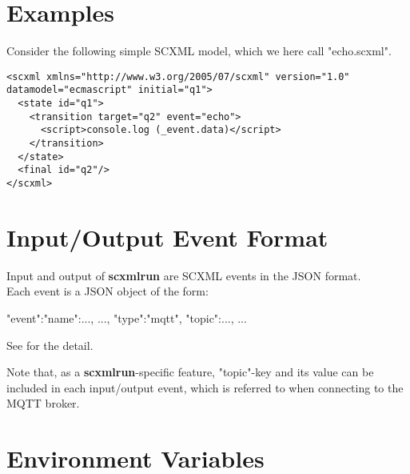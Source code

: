 \documentclass[fancy]{article}
\begin{document}
\section{Examples}
Consider the following simple SCXML model, which we here call "echo.scxml".

\begin{verbatim}
<scxml xmlns="http://www.w3.org/2005/07/scxml" version="1.0" datamodel="ecmascript" initial="q1">
  <state id="q1">
    <transition target="q2" event="echo">
      <script>console.log (_event.data)</script>
    </transition>
  </state>
  <final id="q2"/>
</scxml>
\end{verbatim}


\section{Input/Output Event Format}

Input and output of \textbf{scxmlrun} are SCXML events in the JSON format.\\
Each event is a JSON object of the form:
\begin{center}
\LBr"event":\LBr"name":..., ...\RBr, "type":"mqtt", "topic":..., ...\RBr
\end{center}

See  for the detail.

Note that, as a \textbf{scxmlrun}-specific feature,
"topic"-key and its value can be included in each input/output event,
which is referred to when connecting to the MQTT broker.

\section{Environment Variables}
\end{document}
